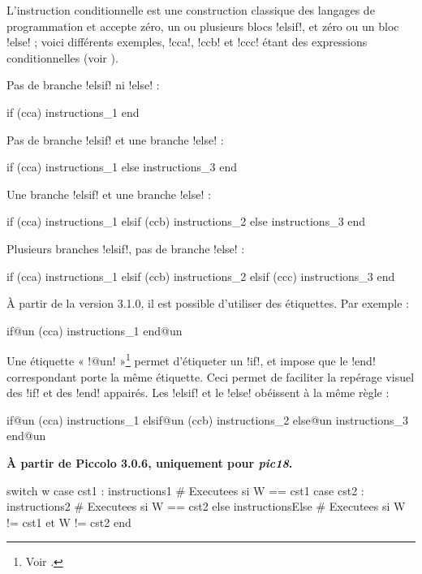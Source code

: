 L'instruction conditionnelle est une construction classique des langages de programmation et accepte zéro, un ou plusieurs blocs \pic!elsif!, et zéro ou un bloc \pic!else! ; voici différents exemples, \pic!cca!, \pic!ccb! et \pic!ccc! étant des expressions conditionnelles (voir ).


Pas de branche \pic!elsif! ni \pic!else! :
\begin{piccolo}
if (cca)
  instructions_1
end
\end{piccolo}

Pas de branche \pic!elsif! et une branche \pic!else! :
\begin{piccolo}
if (cca)
  instructions_1
else
  instructions_3
end
\end{piccolo}

Une branche \pic!elsif! et une branche \pic!else! :
\begin{piccolo}
if (cca)
  instructions_1
elsif (ccb)
  instructions_2
else
  instructions_3
end
\end{piccolo}

Plusieurs branches \pic!elsif!, pas de branche \pic!else! :
\begin{piccolo}
if (cca)
  instructions_1
elsif (ccb)
  instructions_2
elsif (ccc)
  instructions_3
end
\end{piccolo}

À partir de la version 3.1.0, il est possible d'utiliser des étiquettes. Par exemple :
\begin{piccolo}
if@un (cca)
  instructions_1
end@un
\end{piccolo}

Une étiquette « \pic!@un! »\footnote{Voir .} permet d'étiqueter un \pic!if!, et impose que le \pic!end! correspondant porte la même étiquette. Ceci permet de faciliter la repérage visuel des  \pic!if! et des \pic!end! appairés. Les \pic!elsif! et le \pic!else! obéissent à la même règle :
\begin{piccolo}
if@un (cca)
  instructions_1
elsif@un (ccb)
  instructions_2
else@un
  instructions_3
end@un
\end{piccolo}




\textbf{À partir de Piccolo 3.0.6, uniquement pour \emph{pic18}.}

\begin{piccolo}
switch w
case cst1 :
  instructions1 # Executees si W == cst1
case cst2 :
  instructions2 # Executees si W == cst2
else
  instructionsElse # Executees si W != cst1 et W != cst2
end
\end{piccolo}

